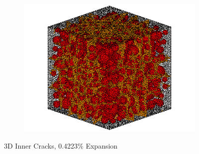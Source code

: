   \begin{figure}[ht!]
  \centering
      \begin{subfigure}{.5\textwidth}
        \centering
        \includegraphics[width=.8\linewidth]{Files/exp_3D/DEF/A30X0C_3_c.png}
      \end{subfigure}%
    \label{fig:DEF_A30X0C_3_crack}
    \caption{3D Inner Cracks, 0.4223\% Expansion}
  \end{figure}


